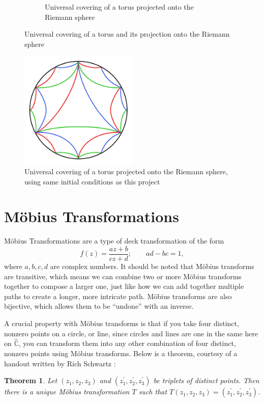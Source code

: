 \documentclass[12pt,a4paper,reqno,parskip=full]{amsart}
\numberwithin{equation}{section}
\theoremstyle{plain}
\newtheorem{theorem}[subsection]{Theorem}
\theoremstyle{definition}
\def\C{{\mathbb C}}
\begin{document}
\begin{figure}
\begin{subfigure}[b]{0.49\textwidth}
         \caption{Universal covering of a torus projected onto the Riemann sphere}
         \label{fig:tesselated}
     \end{subfigure}
        \caption{Universal covering of a torus and its projection onto the Riemann sphere}
        \label{fig:universal-covering}
\end{figure}


\begin{figure}
    \centering
    \captionsetup{justification=centering}
    \includegraphics[width=0.5\textwidth]{images/RS colored detailed 2.jpg}
    \caption{Universal covering of a torus projected onto the Riemann sphere, using same initial conditions as this project}
    \label{fig:universal-covering-2}
\end{figure}

\section{Möbius Transformations}

Möbius Transformations are a type of deck transformation of the form \[f(z)=\frac{az+b}{cz+d};\quad\quad ad-bc=1,\]
where $a,b,c,d$ are complex numbers. It should be noted that Möbius transforms are transitive, which means we can combine two or more Möbius transforms together to compose a larger one, just like how we can add together multiple paths to create a longer, more intricate path. Möbius transforms are also bijective, which allows them to be ``undone'' with an inverse.

A crucial property with Möbius transforms is that if you take four distinct, nonzero points on a circle, or line, since circles and lines are one in the same here on $\hat\C$, you can transform them into any other combination of four distinct, nonzero points using Möbius transforms. Below is a theorem, courtesy of a handout written by Rich Schwartz \cite{Schwartz_2007}:
\begin{theorem}Let $(z_1,z_2,z_3)$ and $(z_1^\prime,z_2^\prime,z_3^\prime)$ be triplets of distinct points. Then there is a unique Möbius transformation $T$ such that $T(z_1,z_2,z_3)=(z_1^\prime,z_2^\prime,z_3^\prime)$.
\end{theorem}
\end{document}
